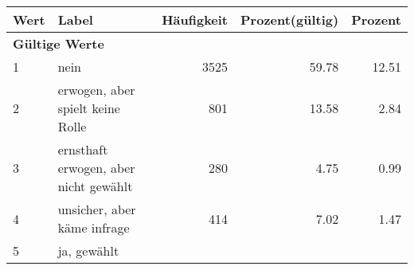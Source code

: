      \begin{longtable}{lXrrr}
     \toprule
     \textbf{Wert} & \textbf{Label} & \textbf{Häufigkeit} & \textbf{Prozent(gültig)} & \textbf{Prozent} \\
     \endhead
     \midrule
     \multicolumn{5}{l}{\textbf{Gültige Werte}}\\

     1 &
     \multicolumn{1}{X}{ nein   } &


       \num{3525} &
       \num[round-mode=places,round-precision=2]{59.78} &
         \num[round-mode=places,round-precision=2]{12.51} \\

     2 &
     \multicolumn{1}{X}{ erwogen, aber spielt keine Rolle   } &


       \num{801} &
       \num[round-mode=places,round-precision=2]{13.58} &
         \num[round-mode=places,round-precision=2]{2.84} \\

     3 &
     \multicolumn{1}{X}{ ernsthaft erwogen, aber nicht gewählt   } &


       \num{280} &
       \num[round-mode=places,round-precision=2]{4.75} &
         \num[round-mode=places,round-precision=2]{0.99} \\

     4 &
     \multicolumn{1}{X}{ unsicher, aber käme infrage   } &


       \num{414} &
       \num[round-mode=places,round-precision=2]{7.02} &
         \num[round-mode=places,round-precision=2]{1.47} \\

     5 &
     \multicolumn{1}{X}{ ja, gewählt   } &



\end{longtable}
